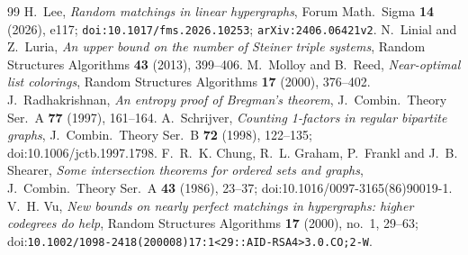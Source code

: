 \documentclass[10pt,a4paper]{amsart}
\begin{document}
\begin{thebibliography}{99}
 H.~Lee, \emph{Random matchings in linear hypergraphs}, Forum Math.\ Sigma \textbf{14} (2026), e117; \nolinkurl{doi:10.1017/fms.2026.10253}; \nolinkurl{arXiv:2406.06421v2}.
 N.~Linial and Z.~Luria, \emph{An upper bound on the number of Steiner triple systems}, Random Structures Algorithms \textbf{43} (2013), 399--406.
 M.~Molloy and B.~Reed, \emph{Near-optimal list colorings}, Random Structures Algorithms \textbf{17} (2000), 376--402.
 J.~Radhakrishnan, \emph{An entropy proof of Bregman's theorem}, J.\ Combin.\ Theory Ser.\ A \textbf{77} (1997), 161--164.
 A.~Schrijver, \emph{Counting 1-factors in regular bipartite graphs}, J.\ Combin.\ Theory Ser.\ B \textbf{72} (1998), 122--135; doi:10.1006/jctb.1997.1798.
 F.~R.~K. Chung, R.~L. Graham, P.~Frankl and J.~B. Shearer, \emph{Some intersection theorems for ordered sets and graphs}, J.\ Combin.\ Theory Ser.\ A \textbf{43} (1986), 23--37; doi:10.1016/0097-3165(86)90019-1.
 V.~H. Vu, \emph{New bounds on nearly perfect matchings in hypergraphs: higher codegrees do help}, Random Structures Algorithms \textbf{17} (2000), no.~1, 29--63; doi:\nolinkurl{10.1002/1098-2418(200008)17:1<29::AID-RSA4>3.0.CO;2-W}.
\end{thebibliography}
\end{document}
